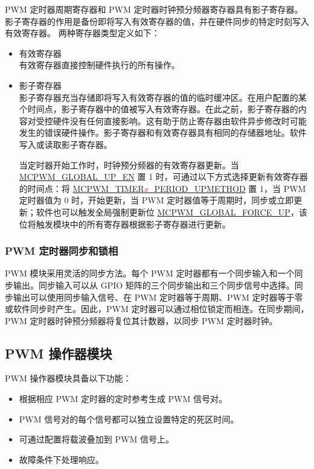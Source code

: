 \documentclass[main\_\_CN.tex]{subfiles}
\begin{document}
PWM 定时器周期寄存器和 PWM 定时器时钟预分频器寄存器具有影子寄存器。影子寄存器的作用是备份即将写入有效寄存器的值，并在硬件同步的特定时刻写入有效寄存器。 两种寄存器类型定义如下：
\begin{itemize}
    \item 有效寄存器\\
     有效寄存器直接控制硬件执行的所有操作。
    \item 影子寄存器\\
    影子寄存器充当存储即将写入有效寄存器的值的临时缓冲区。在用户配置的某个时间点，影子寄存器中的值被写入有效寄存器。在此之前，影子寄存器的内容对受控硬件没有任何直接影响。这有助于防止寄存器由软件异步修改时可能发生的错误硬件操作。影子寄存器和有效寄存器具有相同的存储器地址。软件写入或读取影子寄存器。

    当定时器开始工作时，时钟预分频器的有效寄存器更新。当 \hyperref[fielddesc:MCPWMGLOBALUPEN]{MCPWM\_GLOBAL\_UP\_EN} 置 1 时，可通过以下方式选择更新有效寄存器的时间点：将 \hyperref[fielddesc:MCPWMTIMER0PERIODUPMETHOD]{MCPWM\_TIMER\textcolor{red}{\it{x}}\_PERIOD\_UPMETHOD} 置 1，当 PWM 定时器值为 0 时，开始更新，当 PWM 定时器值等于周期时，同步或立即更新；软件也可以触发全局强制更新位 \hyperref[fielddesc:MCPWMGLOBALFORCEUP]{MCPWM\_GLOBAL\_FORCE\_UP}，该位将触发模块中的所有寄存器根据影子寄存器进行更新。
\end{itemize}

\subsubsection{PWM 定时器同步和锁相}
PWM 模块采用灵活的同步方法。每个 PWM 定时器都有一个同步输入和一个同步输出。同步输入可以从 GPIO 矩阵的三个同步输出和三个同步信号中选择。同步输出可以使用同步输入信号、在 PWM 定时器等于周期、PWM 定时器等于零或软件同步时产生。因此，PWM 定时器可以通过相位锁定而相连。在同步期间，PWM 定时器时钟预分频器将复位其计数器，以同步 PWM 定时器时钟。

\subsection{PWM 操作器模块}
PWM 操作器模块具备以下功能：
\begin{itemize}
    \item 根据相应 PWM 定时器的定时参考生成 PWM 信号对。
    \item PWM 信号对的每个信号都可以独立设置特定的死区时间。
    \item 可通过配置将载波叠加到 PWM 信号上。
    \item 故障条件下处理响应。
\end{itemize}
\end{document}
